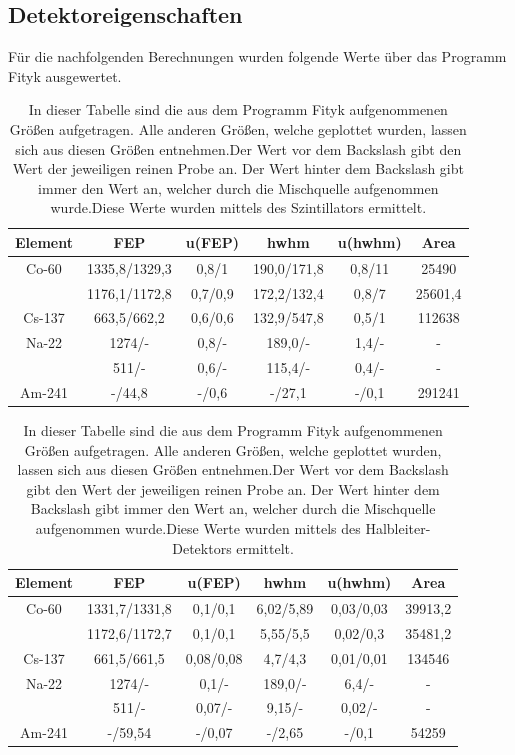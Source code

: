 \subsection{Detektoreigenschaften}
Für die nachfolgenden Berechnungen wurden folgende Werte über das Programm Fityk ausgewertet.
\begin{table}
	\centering
	\caption{In dieser Tabelle sind die aus dem Programm Fityk aufgenommenen Größen aufgetragen. Alle anderen Größen, welche geplottet wurden, lassen sich aus diesen Größen entnehmen.Der Wert vor dem Backslash gibt den Wert der jeweiligen reinen Probe an. Der Wert hinter dem Backslash gibt immer den Wert an, welcher durch die Mischquelle aufgenommen wurde.Diese Werte wurden mittels des Szintillators ermittelt.}
	\begin{tabular}{|c|c|c|c|c|c|}
		\hline 
		Element & FEP & u(FEP) & hwhm & u(hwhm) & Area \\ 
		\hline 
		Co-60  & 1335,8/1329,3 & 0,8/1 & 190,0/171,8 & 0,8/11 & 25490 \\ 
		\hline 
		& 1176,1/1172,8 & 0,7/0,9 & 172,2/132,4 & 0,8/7 & 25601,4 \\ 
		\hline 
		Cs-137  & 663,5/662,2 & 0,6/0,6 & 132,9/547,8 & 0,5/1 & 112638 \\ 
		\hline 
		Na-22  & 1274/- & 0,8/- & 189,0/- & 1,4/- &  - \\ 
		\hline 
		& 511/- & 0,6/- & 115,4/- & 0,4/- & - \\ 
		\hline 
		Am-241 & -/44,8 & -/0,6 & -/27,1 & -/0,1 & 291241 \\ 
		\hline 
	\end{tabular} 
\end{table}
\begin{table}
	\centering
	\caption{In dieser Tabelle sind die aus dem Programm Fityk aufgenommenen Größen aufgetragen. Alle anderen Größen, welche geplottet wurden, lassen sich aus diesen Größen entnehmen.Der Wert vor dem Backslash gibt den Wert der jeweiligen reinen Probe an. Der Wert hinter dem Backslash gibt immer den Wert an, welcher durch die Mischquelle aufgenommen wurde.Diese Werte wurden mittels des Halbleiter-Detektors ermittelt.}
	\begin{tabular}{|c|c|c|c|c|c|}
		\hline 
		Element & FEP & u(FEP) & hwhm & u(hwhm) & Area \\ 
		\hline 
		Co-60  & 1331,7/1331,8 & 0,1/0,1 & 6,02/5,89 & 0,03/0,03 & 39913,2 \\ 
		\hline 
		& 1172,6/1172,7 & 0,1/0,1 & 5,55/5,5 & 0,02/0,3 & 35481,2 \\ 
		\hline 
		Cs-137  & 661,5/661,5 & 0,08/0,08 & 4,7/4,3 & 0,01/0,01 & 134546 \\ 
		\hline 
		Na-22  & 1274/- & 0,1/- & 189,0/- & 6,4/- &  - \\ 
		\hline 
		& 511/- & 0,07/- & 9,15/- & 0,02/- & - \\ 
		\hline 
		Am-241 & -/59,54 & -/0,07 & -/2,65 & -/0,1 & 54259 \\ 
		\hline 
	\end{tabular} 
\end{table}
